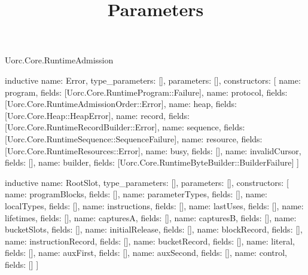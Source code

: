 \begin{lexlean}{Uorc.Core.RuntimeAdmission}
\title{Parameters}
\begin{semanticmodule}
inductive{
  name: Error,
  type_parameters: [],
  parameters: [],
  constructors: [
    {name: program, fields: [Uorc.Core.RuntimeProgram::Failure]},
    {name: protocol, fields: [Uorc.Core.RuntimeAdmissionOrder::Error]},
    {name: heap, fields: [Uorc.Core.Heap::HeapError]},
    {name: record, fields: [Uorc.Core.RuntimeRecordBuilder::Error]},
    {name: sequence, fields: [Uorc.Core.RuntimeSequence::SequenceFailure]},
    {name: resource, fields: [Uorc.Core.RuntimeResources::Error]},
    {name: busy, fields: []},
    {name: invalidCursor, fields: []},
    {name: builder, fields: [Uorc.Core.RuntimeByteBuilder::BuilderFailure]}
  ]
}

inductive{
  name: RootSlot,
  type_parameters: [],
  parameters: [],
  constructors: [
    {name: programBlocks, fields: []},
    {name: parameterTypes, fields: []},
    {name: localTypes, fields: []},
    {name: instructions, fields: []},
    {name: lastUses, fields: []},
    {name: lifetimes, fields: []},
    {name: capturesA, fields: []},
    {name: capturesB, fields: []},
    {name: bucketSlots, fields: []},
    {name: initialRelease, fields: []},
    {name: blockRecord, fields: []},
    {name: instructionRecord, fields: []},
    {name: bucketRecord, fields: []},
    {name: literal, fields: []},
    {name: auxFirst, fields: []},
    {name: auxSecond, fields: []},
    {name: control, fields: []}
  ]
}


\end{semanticmodule}
\end{lexlean}
